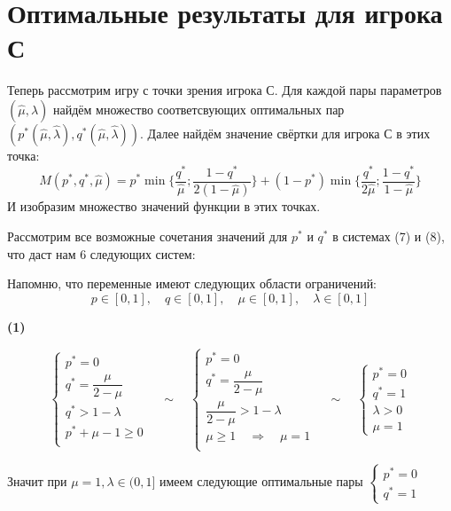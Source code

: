 \section{Оптимальные результаты для игрока С}

Теперь рассмотрим игру с точки зрения игрока С. Для каждой пары параметров $(\hat\mu, \hat\lambda)$ найдём
множество соответсвующих оптимальных пар $(p^*(\hat\mu, \hat\lambda), q^*(\hat\mu, \hat\lambda))$. Далее 
найдём значение свёртки для игрока С в этих точка:
$$
M(p^*,q^*,\hat\mu)=p^*\min{\{\dfrac{q^*}{\hat\mu};\dfrac{1-q^*}{2(1-\hat\mu)}\}} +
				   (1-p^*)\min\{\dfrac{q^*}{2\hat\mu};\dfrac{1-q^*}{1-\hat\mu}\}
$$
И изобразим множество значений функции в этих точках.
 
Рассмотрим все возможные сочетания значений для $p^*$ и $q^*$ в системах (7) и (8), что даст нам 6 следующих систем:

Напомню, что переменные имеют следующих области ограничений:
\[
p \in [0, 1],\quad q \in [0, 1],\quad
\mu \in [0, 1],\quad \lambda \in [0, 1]
\]

\textbf{(1)}

$$
	\begin{cases}
		p^* = 0 \\
		q^* = \dfrac{\mu}{2 - \mu} \\
		q^* > 1 - \lambda \\
		p^* + \mu - 1 \geqslant 0 \\
	\end{cases}
	\quad \sim \quad
	\begin{cases}
		p^* = 0 \\
		q^* = \dfrac{\mu}{2 - \mu} \\
		\dfrac{\mu}{2 - \mu} > 1 - \lambda \\
		\mu \geqslant 1 \quad \Rightarrow \quad \mu = 1 \\
	\end{cases}
	\quad \sim \quad
	\begin{cases}
		p^* = 0 \\
		q^* = 1 \\
		\lambda > 0 \\
		\mu = 1
	\end{cases}
$$

Значит при $\mu = 1, \lambda \in (0,1]$ имеем следующие оптимальные пары
$
\begin{cases}
	p^* = 0 \\ 
	q^* = 1 
\end{cases}
$

